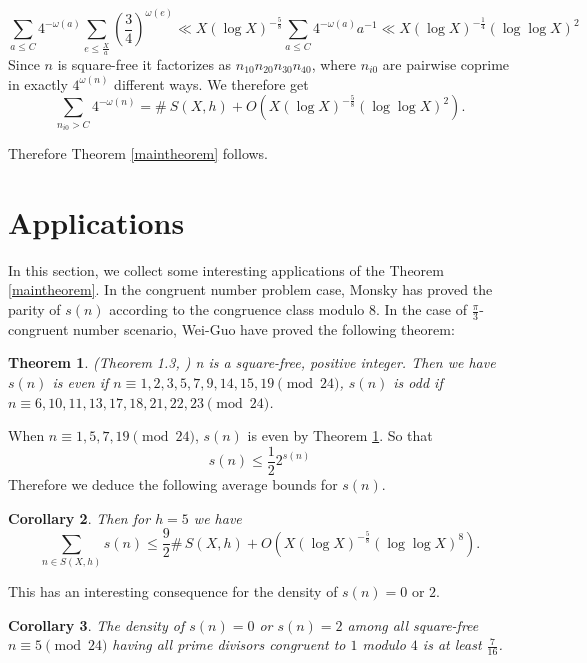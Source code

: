 \documentclass[11pt]{article}
\newtheorem{theorem}{Theorem}[section]
\newtheorem{corollary}[theorem]{Corollary}
\begin{document}
$$\sum\limits_{a\leq C}4^{-\omega(a)}\sum\limits_{e\leq \frac{X}{a}}(\frac{3}{4})^{\omega(e)} \ll X(\log X)^{-\frac{5}{8}}\sum\limits_{a\leq C}4^{-\omega(a)}a^{-1} \ll X(\log X)^{-\frac{1}{4}}(\log \log X)^{2}$$
Since $n$ is square-free it factorizes as $n_{10}n_{20}n_{30}n_{40}$, where $n_{i0}$ are pairwise coprime in exactly $4^{\omega(n)}$ different ways. We therefore get
\begin{equation}\label{eq:10}
\sum\limits_{n_{i0}>C}4^{-\omega(n)}=\#\:S(X,h)+O(X(\log X)^{-\frac{5}{8}}(\log \log X)^{2}).
\end{equation}

 \noindent Therefore Theorem \ref{maintheorem} follows.

\section{Applications}\label{applications}
\noindent In this section, we collect some interesting applications of the Theorem \ref{maintheorem}. In the congruent number problem case, Monsky has proved the parity of $s(n)$ according to the congruence class modulo $8$. In the case of $\frac{\pi}{3}$-congruent number scenario, Wei-Guo have proved the following theorem:
\begin{theorem}\label{Theorem 1}(Theorem 1.3, \cite{WeiGuo})
n is a square-free, positive integer. Then we have \\
$s(n)$ is even if $n\equiv 1, 2, 3, 5, 7, 9, 14, 15, 19 \pmod{24}$, $s(n)$ is odd if $n\equiv 6, 10, 11, 13, 17, 18, 21, 22, 23 \pmod{24}$.
\end{theorem}
\noindent When $n\equiv 1,5,7,19 \pmod{24}$, $s(n)$ is even by Theorem \ref{Theorem 1}. So that
$$s(n)\leq \frac{1}{2}2^{s(n)}$$
Therefore we deduce the following average bounds for $s(n)$.
\begin{corollary}
Then for $h=5$ we have
$$\sum\limits_{n\in S(X,h)}s(n)\leq \frac{9}{2}\#\, S(X,h)+ O(X(\log X)^{-\frac{5}{8}}(\log \log X)^{8}).$$
\end{corollary}
\noindent This has an interesting consequence for the density of $s(n)=0$ or $2$.
\begin{corollary}\label{s(n)=0or2}
The density of $s(n)=0$ or $s(n)=2$ among all square-free $n\equiv 5 \pmod{24}$ having all prime divisors congruent to $1$ modulo $4$ is at least $\frac{7}{16}$.
\end{corollary}
\end{document}
